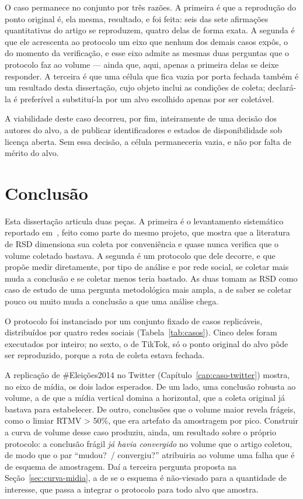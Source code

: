O caso permanece no conjunto por três razões. A primeira é que a reprodução do
ponto original é, ela mesma, resultado, e foi feita: seis das sete afirmações
quantitativas do artigo se reproduzem, quatro delas de forma exata. A segunda é que
ele acrescenta ao protocolo um eixo que nenhum dos demais casos expôs, o do momento
da verificação, e esse eixo admite as mesmas duas perguntas que o protocolo faz ao
volume --- ainda que, aqui, apenas a primeira delas se deixe responder. A terceira é que uma célula que fica vazia
por porta fechada também é um resultado desta dissertação, cujo objeto inclui as
condições de coleta; declará-la é preferível a substituí-la por um alvo escolhido
apenas por ser coletável.

A viabilidade deste caso decorreu, por fim, inteiramente de uma decisão dos autores
do alvo, a de publicar identificadores e estados de
disponibilidade sob licença aberta. Sem essa decisão, a célula permaneceria vazia,
e não por falta de mérito do alvo.

\chapter{Conclusão}
\label{cap:conclusao}

Esta dissertação articula duas peças. A primeira é o levantamento sistemático
reportado em~, feito como parte do mesmo projeto, que
mostra que a literatura de RSD dimensiona sua coleta por conveniência e quase nunca
verifica que o volume coletado bastava. A segunda é um protocolo que dele decorre, e
que propõe medir diretamente, por tipo de análise e por rede social, se coletar mais
muda a conclusão e se coletar menos teria bastado. As duas tomam as RSD como caso de
estudo de uma pergunta metodológica mais ampla, a de saber se coletar pouco ou muito
muda a conclusão a que uma análise chega.

O protocolo foi instanciado por um conjunto fixado de casos replicáveis, distribuídos
por quatro redes sociais (Tabela~\ref{tab:casos}). Cinco deles foram executados por
inteiro; no sexto, o de TikTok, só o ponto original do alvo pôde ser reproduzido,
porque a rota de coleta estava fechada.

A replicação de \#Eleições2014 no Twitter (Capítulo~\ref{cap:caso-twitter}) mostra, no
eixo de mídia, os dois lados esperados. De um lado, uma conclusão robusta ao volume, a de
que a mídia vertical domina a horizontal, que a coleta original já bastava para
estabelecer. De outro, conclusões que o volume maior revela frágeis, como o
limiar RTMV > 50\%, que era artefato da amostragem por pico. Construir a curva de
volume desse caso produziu, ainda, um resultado sobre o próprio protocolo: a
conclusão frágil \emph{já havia convergido} no volume que o artigo coletou, de modo
que o par ``mudou?\ / convergiu?'' atribuiria ao volume uma falha que é de esquema
de amostragem. Daí a terceira pergunta proposta na
Seção~\ref{sec:curva-midia}, a de se o esquema é não-viesado para a quantidade de
interesse, que passa a integrar o protocolo para todo alvo que amostra.

